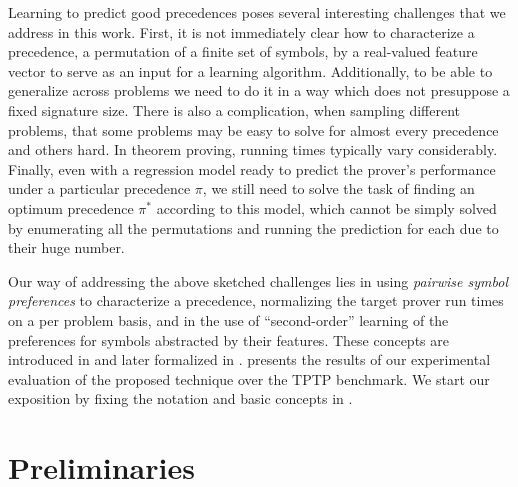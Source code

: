\documentclass[a4paper]{easychair}
\begin{document}
Learning to predict good precedences poses several interesting challenges that we address in this work.
First, it is not immediately clear how to characterize a precedence, a permutation of a finite set of symbols,
by a real-valued feature vector to serve as an input for a learning algorithm. 
Additionally, to be able to generalize across problems
we need to do it in a way which does not presuppose a fixed signature size. 
There is also a complication, when sampling different problems,
that some problems may be easy to solve for almost every precedence and others hard.
In theorem proving, running times typically vary considerably.
Finally, even with a regression model ready to predict the prover's performance 
under a particular precedence $\pi$, we still need to solve the task of finding 
an optimum precedence $\pi^*$ according to this model,
which cannot be simply solved by enumerating all the permutations and running the prediction for each
due to their huge number.

%	

Our way of addressing the above sketched challenges lies in using \emph{pairwise symbol preferences}
to characterize a precedence, normalizing the target prover run times on a per problem basis,
and in the use of ``second-order'' learning of the preferences for symbols abstracted by their features.
These concepts are introduced in  and later formalized in .
 presents the results of our experimental evaluation of the proposed technique over the TPTP \cite{Sut17} benchmark.
We start our exposition by fixing the notation and basic concepts in .


\section{Preliminaries} \label{sect:prelim}
\end{document}
